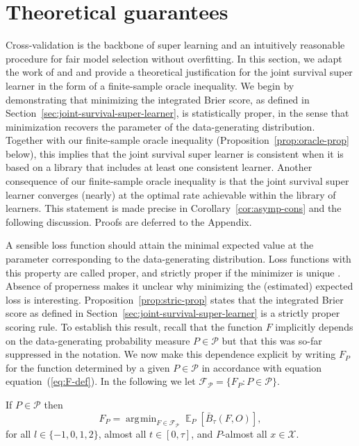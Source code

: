 \documentclass[alpha-refs]{wiley-article}
\DeclareMathOperator{\E}{\mathbb{E}} %
\newcommand{\1}{\mathds{1}}
\DeclareMathOperator*{\argmin}{\arg\!\min}
\begin{document}
\section{Theoretical guarantees}
\label{sec:theor-results-prop}

Cross-validation is the backbone of super learning and an intuitively
reasonable procedure for fair model selection without overfitting. In
this section, we adapt the work of \cite{van2003unicv} and
\cite{vaart2006oracle} and provide a theoretical justification for the
joint survival super learner in the form of a finite-sample oracle
inequality. We begin by demonstrating that minimizing the integrated
Brier score, as defined in
Section~\ref{sec:joint-survival-super-learner}, is statistically
proper, in the sense that minimization recovers the parameter of the
data-generating distribution. Together with our finite-sample oracle
inequality (Proposition~\ref{prop:oracle-prop} below), this implies
that the joint survival super learner is consistent when it is based
on a library that includes at least one consistent learner. Another
consequence of our finite-sample oracle inequality is that the joint
survival super learner converges (nearly) at the optimal rate
achievable within the library of learners. This statement is made
precise in Corollary~\ref{cor:asymp-cons} and the following
discussion. Proofs are deferred to the Appendix.

A sensible loss function should attain the minimal expected value at
the parameter corresponding to the data-generating distribution. Loss
functions with this property are called proper, and strictly proper if
the minimizer is unique \citep{gneiting2007strictly}. Absence of
properness makes it unclear why minimizing the (estimated) expected
loss is interesting.  Proposition~\ref{prop:stric-prop} states that
the integrated Brier score as defined in
Section~\ref{sec:joint-survival-super-learner} is a strictly proper
scoring rule. To establish this result, recall that the function \(F\)
implicitly depends on the data-generating probability measure
\(P\in\mathcal P\) but that this was so-far suppressed in the
notation. We now make this dependence explicit by writing \(F_P\) for
the function determined by a given \(P \in\mathcal{P}\) in accordance
with equation equation~(\ref{eq:F-def}). In the following we let \(
\mathcal{F}_{\mathcal{P}} = \{F_P : P \in \mathcal{P}\} \).

\begin{proposition}
  \label{prop:stric-prop}
  If \(P \in\mathcal{P}\) then
  \begin{equation*}
    F_P = \argmin_{F \in \mathcal{F}_{\mathcal{P}}}
    \E_P{[\bar{B}_\tau(F, O)]}
    ,
  \end{equation*}
  for all \( l \in \{-1, 0, 1, 2 \} \), almost all
  \( t \in [0,\tau] \), and \( P \)-almost all
  \( x \in \mathcal{X} \).
\end{proposition}
\end{document}
